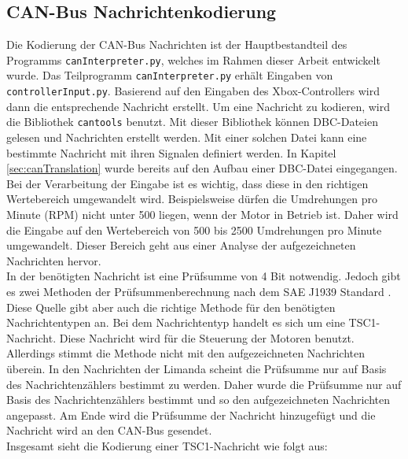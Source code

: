 \subsection{CAN-Bus Nachrichtenkodierung} \label{sec:canBus}
Die Kodierung der CAN-Bus Nachrichten ist der Hauptbestandteil des Programms \texttt{canInterpreter.py}, welches im Rahmen dieser Arbeit
entwickelt wurde. 
Das Teilprogramm \texttt{canInterpreter.py} erhält Eingaben von \texttt{controllerInput.py}. Basierend auf den
Eingaben des Xbox-Controllers wird dann die entsprechende Nachricht erstellt. Um eine Nachricht zu kodieren, wird die Bibliothek \texttt{cantools} benutzt.
Mit dieser Bibliothek können DBC-Dateien gelesen und Nachrichten erstellt werden. Mit einer solchen Datei kann eine
bestimmte Nachricht mit ihren Signalen definiert werden. In Kapitel \ref{sec:canTranslation} wurde bereits auf den
Aufbau einer DBC-Datei eingegangen. \\
Bei der Verarbeitung der Eingabe ist es wichtig, dass diese in den richtigen Wertebereich umgewandelt wird.
Beispielsweise dürfen die Umdrehungen pro Minute (RPM) nicht unter 500 liegen, wenn der Motor in Betrieb ist.
Daher wird die Eingabe auf den Wertebereich von 500 bis 2500 Umdrehungen pro Minute umgewandelt. Dieser Bereich
geht aus einer Analyse der aufgezeichneten Nachrichten hervor.
\\
In der benötigten Nachricht ist eine Prüfsumme von 4 Bit notwendig. Jedoch gibt es zwei Methoden der Prüfsummenberechnung
nach dem SAE J1939 Standard \cite{VectorSAE}. Diese Quelle gibt aber auch die richtige Methode für den benötigten Nachrichtentypen
an. Bei dem Nachrichtentyp handelt es sich um eine TSC1-Nachricht. Diese Nachricht wird für die Steuerung der Motoren
benutzt. Allerdings stimmt die Methode nicht mit den aufgezeichneten Nachrichten überein. In den Nachrichten der Limanda
scheint die Prüfsumme nur auf Basis des Nachrichtenzählers bestimmt zu werden. Daher wurde die Prüfsumme nur auf Basis des Nachrichtenzählers
bestimmt und so den aufgezeichneten Nachrichten angepasst.
Am Ende wird die Prüfsumme der Nachricht hinzugefügt und die
Nachricht wird an den CAN-Bus gesendet. \\
Insgesamt sieht die Kodierung einer TSC1-Nachricht wie folgt aus:
